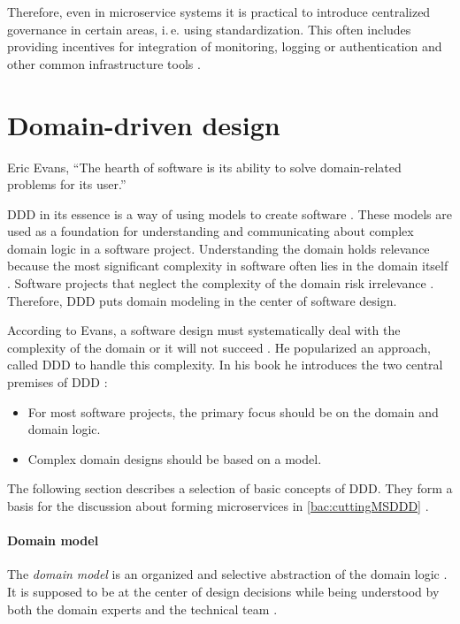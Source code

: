 Therefore, even in microservice systems it is practical to introduce centralized governance in certain areas, i.\,e. using standardization.
This often includes providing incentives for integration of monitoring, logging or authentication and other common infrastructure tools \citep{Vogels2006}.

\section{Domain-driven design}
\label{bac:ddd}
\begin{chapquote}{Eric Evans, \cite[p. 4]{Evans2004}}
``The hearth of software is its ability to solve domain-related problems for its user.''
\end{chapquote}

\ac{DDD} in its essence is a way of using models to create software \cite[5:00]{RadioDDD2015}.
These models are used as a foundation for understanding and communicating about complex domain logic in a software project.
Understanding the domain holds relevance because the most significant complexity in software often lies in the domain itself \cite[p. xxi]{Evans2004}.
Software projects that neglect the complexity of the domain risk irrelevance \cite[p. 5]{Evans2004}.
Therefore, \ac{DDD} puts domain modeling in the center of software design.

According to Evans, a software design must systematically deal with the complexity of the domain or it will not succeed \citep[p. xxi]{Evans2004}.
He popularized an approach, called \acl{DDD} to handle this complexity.
In his book he introduces the two central premises of \ac{DDD} \cite[p. xxi]{Evans2004}:
\begin{itemize}
\item For most software projects, the primary focus should be on the domain and domain logic.
\item Complex domain designs should be based on a model.
\end{itemize}

The following section describes a selection of basic concepts of \ac{DDD}.
They form a basis for the discussion about forming microservices in \ref{bac:cuttingMSDDD} .

\paragraph{Domain model}
The \textit{domain model} is an organized and selective abstraction of the domain logic \citep[p. 3]{Evans2004}.
It is supposed to be at the center of design decisions while being understood by both the domain experts and the technical team \citep[p. 32]{Evans2004}.

